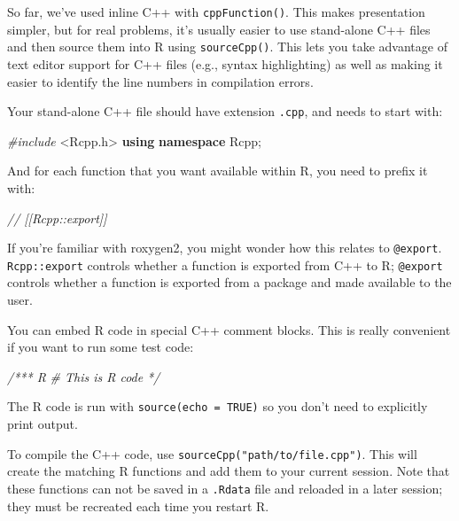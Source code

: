 \documentclass[]{book}
\makeatletter
\newenvironment{Shaded}{\begin{snugshade}}{\end{snugshade}}
\newcommand{\CommentTok}[1]{\textcolor[rgb]{0.37,0.37,0.37}{\textit{#1}}}
\newcommand{\ImportTok}[1]{#1}
\newcommand{\KeywordTok}[1]{\textcolor[rgb]{0.27,0.27,0.27}{\textbf{#1}}}
\newcommand{\NormalTok}[1]{#1}
\newcommand{\PreprocessorTok}[1]{\textcolor[rgb]{0.37,0.37,0.37}{\textit{#1}}}
\newcommand{\indexc}[1]{\index{#1@\texttt{#1}}}
\makeatother
\begin{document}
So far, we've used inline C++ with \texttt{cppFunction()}. This makes presentation simpler, but for real problems, it's usually easier to use stand-alone C++ files and then source them into R using \texttt{sourceCpp()}. This lets you take advantage of text editor support for C++ files (e.g., syntax highlighting) as well as making it easier to identify the line numbers in compilation errors. \indexc{sourceCpp()}

Your stand-alone C++ file should have extension \texttt{.cpp}, and needs to start with:

\begin{Shaded}
\begin{Highlighting}[]
\PreprocessorTok{#include }\ImportTok{<Rcpp.h>}
\KeywordTok{using} \KeywordTok{namespace}\NormalTok{ Rcpp;}
\end{Highlighting}
\end{Shaded}

And for each function that you want available within R, you need to prefix it with:

\begin{Shaded}
\begin{Highlighting}[]
\CommentTok{// [[Rcpp::export]]}
\end{Highlighting}
\end{Shaded}

If you're familiar with roxygen2, you might wonder how this relates to \texttt{@export}. \texttt{Rcpp::export} controls whether a function is exported from C++ to R; \texttt{@export} controls whether a function is exported from a package and made available to the user.

You can embed R code in special C++ comment blocks. This is really convenient if you want to run some test code:

\begin{Shaded}
\begin{Highlighting}[]
\CommentTok{/*** R}
\CommentTok{# This is R code}
\CommentTok{*/}
\end{Highlighting}
\end{Shaded}

The R code is run with \texttt{source(echo\ =\ TRUE)} so you don't need to explicitly print output.

To compile the C++ code, use \texttt{sourceCpp("path/to/file.cpp")}. This will create the matching R functions and add them to your current session. Note that these functions can not be saved in a \texttt{.Rdata} file and reloaded in a later session; they must be recreated each time you restart R.
\end{document}
